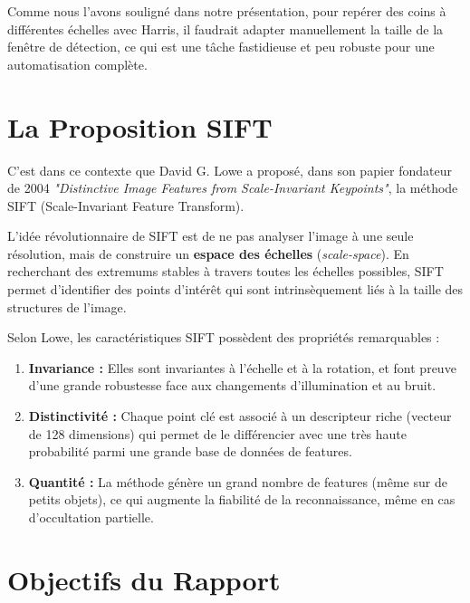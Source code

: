 \documentclass[a4paper,12pt]{report}
\begin{document}
Comme nous l'avons souligné dans notre présentation, pour repérer des coins à différentes échelles avec Harris, il faudrait adapter manuellement la taille de la fenêtre de détection, ce qui est une tâche fastidieuse et peu robuste pour une automatisation complète.

\section{La Proposition SIFT}

C'est dans ce contexte que David G. Lowe a proposé, dans son papier fondateur de 2004 \textit{"Distinctive Image Features from Scale-Invariant Keypoints"}, la méthode SIFT (Scale-Invariant Feature Transform).

L'idée révolutionnaire de SIFT est de ne pas analyser l'image à une seule résolution, mais de construire un \textbf{espace des échelles} (\textit{scale-space}). En recherchant des extremums stables à travers toutes les échelles possibles, SIFT permet d'identifier des points d'intérêt qui sont intrinsèquement liés à la taille des structures de l'image.

Selon Lowe, les caractéristiques SIFT possèdent des propriétés remarquables :
\begin{enumerate}
    \item \textbf{Invariance :} Elles sont invariantes à l'échelle et à la rotation, et font preuve d'une grande robustesse face aux changements d'illumination et au bruit.
    \item \textbf{Distinctivité :} Chaque point clé est associé à un descripteur riche (vecteur de 128 dimensions) qui permet de le différencier avec une très haute probabilité parmi une grande base de données de features.
    \item \textbf{Quantité :} La méthode génère un grand nombre de features (même sur de petits objets), ce qui augmente la fiabilité de la reconnaissance, même en cas d'occultation partielle.
\end{enumerate}

\section{Objectifs du Rapport}
\end{document}
